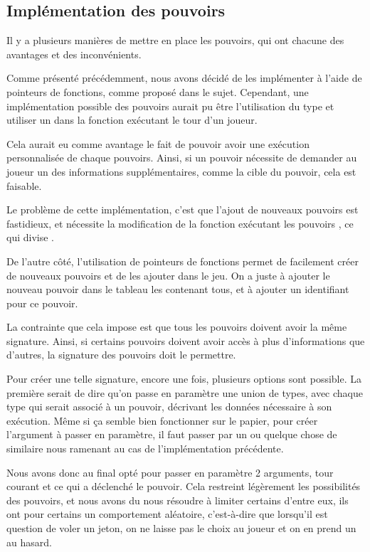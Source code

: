 
\subsection{Implémentation des pouvoirs}

Il y a plusieurs manières de mettre en place les pouvoirs, qui ont chacune des avantages et des inconvénients.

Comme présenté précédemment, nous avons décidé de les implémenter à l'aide de pointeurs de fonctions, comme proposé dans le sujet. Cependant, une implémentation possible des pouvoirs aurait pu être l'utilisation du type  et utiliser un  dans la fonction exécutant le tour d'un joueur.

Cela aurait eu comme avantage le fait de pouvoir avoir une exécution personnalisée de chaque pouvoirs. Ainsi, si un pouvoir nécessite de demander au joueur un des informations supplémentaires, comme la cible du pouvoir, cela est faisable.

Le problème de cette implémentation, c'est que l'ajout de nouveaux pouvoirs est fastidieux, et nécessite la modification de la fonction exécutant les pouvoirs , ce qui divise .

De l'autre côté, l'utilisation de pointeurs de fonctions permet de facilement créer de nouveaux pouvoirs et de les ajouter dans le jeu. On a juste à ajouter le nouveau pouvoir dans le tableau les contenant tous, et à ajouter un identifiant pour ce pouvoir.

La contrainte que cela impose est que tous les pouvoirs doivent avoir la même signature. Ainsi, si certains pouvoirs doivent avoir accès à plus d'informations que d'autres, la signature des pouvoirs doit le permettre.

Pour créer une telle signature, encore une fois, plusieurs options sont possible. La première serait de dire qu'on passe en paramètre une union de types, avec chaque type qui serait associé à un pouvoir, décrivant les données nécessaire à son exécution. Même si ça semble bien fonctionner sur le papier, pour créer l'argument à passer en paramètre, il faut passer par un  ou quelque chose de similaire nous ramenant au cas de l'implémentation précédente.

Nous avons donc au final opté pour passer en paramètre 2 arguments, tour courant et ce qui a déclenché le pouvoir. Cela restreint légèrement les possibilités des pouvoirs, et nous avons du nous résoudre à limiter certains d'entre eux, ils ont pour certains un comportement aléatoire, c'est-à-dire que lorsqu'il est question de voler un jeton, on ne laisse pas le choix au joueur et on en prend un au hasard.

